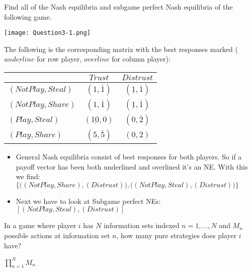 \documentclass[../main.tex]{subfiles}
\begin{document}
\begin{question}
    Find all of the Nash equilibria and subgame perfect Nash equilibria of the following game.

    \centering
    \texttt{[image: Question3-1.png]}
\end{question}

\begin{solution} 
The following is the corresponding matrix with the best responses marked ($\underline{underline}$ for row player, $\overline{overline}$ for column player): 
	\begin{center}
	    \begin{tabular}{|l|c|c|}
	    \hline
		& $Trust$ & $Distrust$ \\
		\hline
		$(Not Play,Steal)$ & $(1,\overline{1})$ & $(\underline{1},\overline{1})$ \\
		\hline
		$(Not Play,Share)$ & $(1,\overline{1})$ & $(\underline{1},\overline{1})$ \\
		\hline
		$(Play,Steal)$ & $(\underline{10},0)$ & $(0,\overline{2})$ \\
		\hline
		$(Play,Share)$ & $(5,\overline{5})$ & $(0,2)$ \\
		\hline
	    \end{tabular}
    \end{center}
\begin{itemize}
	\item General Nash equilibria consist of best responses for both players. So if a payoff vector has been both underlined and overlined it's an NE. With this we find:\\
$\{\Big((Not Play, Share),(Distrust)\Big),\Big((Not Play, Steal),(Distrust)\Big)\}$
	\item Next we have to look at Subgame perfect NEs: $[(Not Play, Steal),(Distrust)]$
\end{itemize}
\end{solution}

\begin{question}
In a game where player $i$ has $N$ information sets indexed $n = 1, ..., N$ and $M_n$ possible actions at information set $n$, how many pure strategies does player $i$ have?
\end{question}

\begin{solution}
$\prod\limits_{n=1}^N M_n$
\end{solution}
\end{document}
